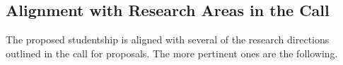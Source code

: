 \documentclass[10pt]{article}
\begin{document}














\subsection*{Alignment with Research Areas in the Call}

The proposed studentship is aligned with several of the research directions outlined in the call for proposals. The more pertinent ones are the following. 
\end{document}
